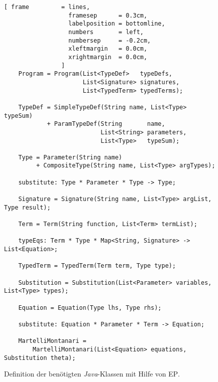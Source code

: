 \begin{figure}[!ht]
\centering
\begin{Verbatim}[ frame         = lines, 
                  framesep      = 0.3cm, 
                  labelposition = bottomline,
                  numbers       = left,
                  numbersep     = -0.2cm,
                  xleftmargin   = 0.0cm,
                  xrightmargin  = 0.0cm,
                ]
    Program = Program(List<TypeDef>   typeDefs, 
                      List<Signature> signatures, 
                      List<TypedTerm> typedTerms);
    
    TypeDef = SimpleTypeDef(String name, List<Type> typeSum)
            + ParamTypeDef(String       name, 
                           List<String> parameters, 
                           List<Type>   typeSum);
    
    Type = Parameter(String name) 
         + CompositeType(String name, List<Type> argTypes);
    
    substitute: Type * Parameter * Type -> Type;
    
    Signature = Signature(String name, List<Type> argList, Type result);
    
    Term = Term(String function, List<Term> termList);
    
    typeEqs: Term * Type * Map<String, Signature> -> List<Equation>;
    
    TypedTerm = TypedTerm(Term term, Type type);
    
    Substitution = Substitution(List<Parameter> variables, List<Type> types);
    
    Equation = Equation(Type lhs, Type rhs);
    
    substitute: Equation * Parameter * Term -> Equation;
    
    MartelliMontanari = 
        MartelliMontanari(List<Equation> equations, Substitution theta);
\end{Verbatim}
\vspace*{-0.3cm}
\caption{Definition der ben\"otigten \textsl{Java}-Klassen mit Hilfe von \textsc{EP}.}
\label{fig:typeExpr.ep}
\end{figure}


